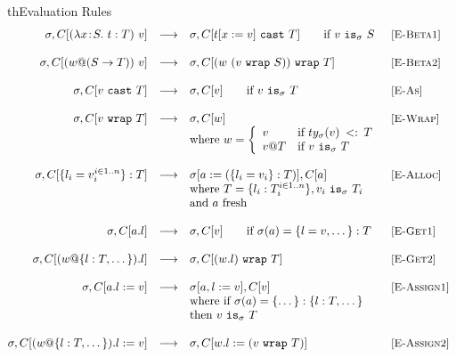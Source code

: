 \documentclass{article}
\makeatletter
\newcommand{\lam}[4]{\lambda#1\!:\!#2.\,\,#4:#3}
\newcommand{\lamt}[2]{#1\rightarrow #2}
\newcommand{\app}[2]{#1~#2}
\newcommand{\astype}[2]{#1~\t{cast}~#2}
\newcommand{\subtype}[2]{#1 \,\sword\, #2}
\newcommand{\sword}{\mbox{\,\,$<:$\,\,}}
\renewcommand{\t}[1]{{\tt #1}}
\newcommand{\red}[0]{\longrightarrow}  %
\newcommand{\lred}[0]{\red}  %
\newcommand{\objty}[1]{\{#1\}}
\newcommand{\obje}[2]{\{#1\}:{#2}}
\newcommand{\objget}[2]{#1.#2}
\newcommand{\objset}[3]{#1.#2:=#3}
\newcommand{\wrapv}[2]{#1@#2}
\newcommand{\wrap}[2]{#1~\t{wrap}~#2}
\newcommand{\allocty}[1]{ty_{\sigma}(#1)}
\newcommand{\istype}[2]{#1~\t{is}_{\sigma}~ #2}
\makeatother
\begin{document}
\begin{displayfigure}{th}{Evaluation Rules}
\label{fig:eval} 
\footnotesize
\[
\begin{array}{@{}rcllr}
	\sigma,C[{\app{(\lam{x}{S}{T}{t})}{v}}]
	&\lred&
	\sigma,C[\astype{t[x:=v]}{T}]
	\qquad\mbox{if $\istype v S$}
	&\rel{E-Beta1}
\\~\\
	\sigma,C[{\app{(\wrapv{w}{(\lamt{S}{T})})}
	              {v}}]
	&\lred&
	\sigma,C[\wrap{(w~(\wrap{v}{S}))}{T}]
	&\rel{E-Beta2}
\\~\\
	\sigma,C[\astype{v}{T}]
	&\lred&
	\sigma,C[v]
	\qquad\mbox{if $\istype{v}{T}$}
	&\rel{E-As}
\\~\\
	\sigma,C[\wrap{v}{T}]
	&\lred&
	\sigma,C[w]
	&\rel{E-Wrap} \\
	&&\mbox{where $w=\left\{
		\begin{array}{ll}
			v				&\mbox{if $\subtype{\allocty{v}}{T}$} \\
			\wrapv{v}{T}		&\mbox{if $\istype{v}{T}$}
		\end{array}\right.$}
\\~\\
	\sigma,C[\obje{l_i=v_i^{i\in 1..n}}{T}]
	&\lred&
	\sigma[a:=(\obje{l_i=v_i}{T})],C[a] 
	&\rel{E-Alloc} \\
	&&\mbox{where }T=\objty{l_i:T_i^{i\in 1..n}}, \istype{v_i}{T_i} \\
	&&\mbox{and $a$ fresh}
\\~\\
	\sigma,C[\objget{a}{l}]
	&\lred&
	\sigma,C[v]
	\qquad\mbox{if $\sigma(a)=\obje{l=v,\dots}{T}$}
	&\rel{E-Get1}
\\~\\
	\sigma,C[\objget{(\wrapv{w}{\objty{l:T,\dots}})}{l}]
	&\lred&
	\sigma,C[\wrap{(\objget{w}{l})}{T}] 
	&\rel{E-Get2}
\\~\\
	\sigma,C[\objset{a}{l}{v}]
	&\lred&
	\sigma[a,l:=v],C[v] 
	&\rel{E-Assign1} \\
	&&\mbox{where if $\sigma(a)=\obje{\dots}{\objty{l:T,\dots}}$ }\\
	&&\mbox{then $\istype{v}{T}$} 
\\~\\
	\sigma,C[\objset{(\wrapv{w}{\objty{l:T,\dots}})}{l}{v}]
	&\lred&
	\sigma,C[\objset{w}{l}{(\wrap{v}{T})}]
	&\rel{E-Assign2} \\
\end{array}
\]
\end{displayfigure}
\end{document}
